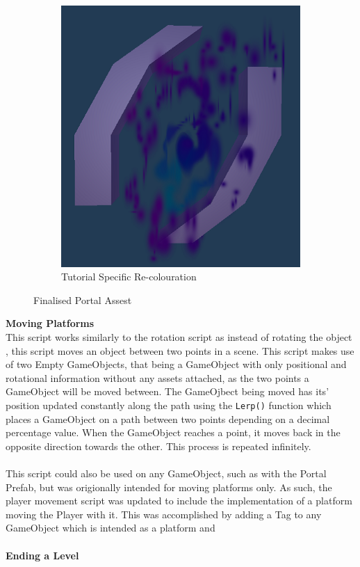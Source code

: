 \begin{figure}[H]
\begin{subfigure}{0.4\textwidth}
  \includegraphics[width=1\linewidth]{Figures/finportb.png}
  \caption{Tutorial Specific Re-colouration}
\end{subfigure}
\caption{Finalised Portal Assest}
\label{portals}
\end{figure}

\noindent \textbf{Moving Platforms}\\
This script works similarly to the rotation script as instead of rotating the object , this script moves an object between two points in a scene. This script makes use of two Empty GameObjects, that being a GameObject with only positional and rotational information without any assets attached, as the two points a GameObject will be moved between. The GameOjbect being moved has its' position updated constantly along the path using the \texttt{Lerp()} function which places a GameObject on a path between two points depending on a decimal percentage value. When the GameObject reaches a point, it moves back in the opposite direction  towards the other. This process is repeated infinitely.
\\\\
This script could also be used on any GameObject, such as with the Portal Prefab, but was origionally intended for moving platforms only. As such, the player movement script was updated to include the implementation of a platform moving the Player with it. This was accomplished by adding a Tag to any GameObject which is intended as a platform and 
\\\\
\textbf{Ending a Level}\\


